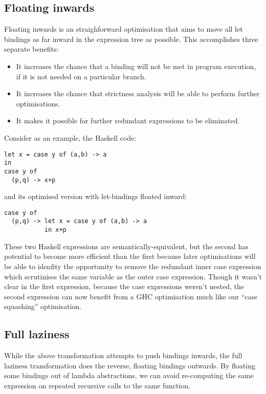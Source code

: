\subsection*{Floating inwards}

Floating inwards is an straighforward optimisation that aims to move all let bindings as far inward in the expression tree as possible. This accomplishes three separate benefits:
\begin{itemize}
\item It increases the chance that a binding will not be met in program execution, if it is not needed on a particular branch.
\item It increases the chance that strictness analysis will be able to perform further optimisations.
\item It makes it possible for further redundant expressions to be eliminated.\cite{jones1996}
\end{itemize}

Consider as an example, the Haskell code:
\begin{lstlisting}
let x = case y of (a,b) -> a
in
case y of
  (p,q) -> x+p
\end{lstlisting}

and its optimised version with let-bindings floated inward:
\begin{lstlisting}
case y of
  (p,q) -> let x = case y of (a,b) -> a
           in x+p
\end{lstlisting}

These two Haskell expressions are semantically-equivalent, but the second has potential to become more efficient than the first because later optimisations will be able to idenfity the opportunity to remove the redundant inner case expression which scrutinises the same variable as the outer case expression.\cite{jones1996} Though it wasn't clear in the first expression, because the case expressions weren't nested, the second expression can now benefit from a GHC optimisation much like our ``case squashing'' optimisation.

\subsection*{Full laziness}

While the above transformation attempts to push bindings inwards, the full laziness transformation does the reverse, floating bindings outwards. By floating some bindings out of lambda abstractions, we can avoid re-computing the same expression on repeated recursive calls to the same function.\cite{jones1996}

